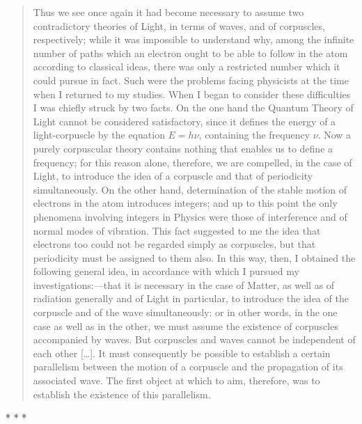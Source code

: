\begin{quotation}
Thus we see once again it had become necessary to assume two
contradictory theories of Light, in terms of waves, and of corpuscles,
respectively; while it was impossible to understand why, among the
infinite number of paths which an electron ought to be able to follow in
the atom according to classical ideas, there was only a restricted
number which it could pursue in fact. Such were the problems facing
physicists at the time when I returned to my studies. When I began to
consider these difficulties I was chiefly struck by two facts. On the
one hand the Quantum Theory of Light cannot be considered satisfactory,
since it defines the energy of a light-corpuscle by the equation
$E = h\nu$, containing the frequency $\nu$. Now a purely
corpuscular theory contains nothing that enables us to define a
frequency; for this reason alone, therefore, we are compelled, in the
case of Light, to introduce the idea of a corpuscle and that of
periodicity simultaneously. On the other hand, determination of the
stable motion of electrons in the atom introduces integers; and up to
this point the only phenomena involving integers in Physics were those
of interference and of normal modes of vibration. This fact suggested to
me the idea that electrons too could not be regarded simply as
corpuscles, but that periodicity must be assigned to them also. In this
way, then, I obtained the following general idea, in accordance with
which I pursued my investigations:---that it is necessary in the case of
Matter, as well as of radiation generally and of Light in particular, to
introduce the idea of the corpuscle and of the wave simultaneously: or
in other words, in the one case as well as in the other, we must assume
the existence of corpuscles accompanied by waves. But corpuscles and
waves cannot be independent of each other [\ldots]. It must consequently be
possible to establish a certain parallelism between the motion of a
corpuscle and the propagation of its associated wave. The first object
at which to aim, therefore, was to establish the existence of this
parallelism.

\end{quotation}

\begin{center}
* * *
\end{center}

